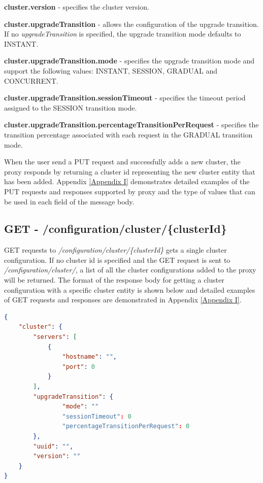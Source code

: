 \documentclass[a4paper,11pt,twoside]{report}
\begin{document}
\begin{list}{-}{}
  \item\textbf{{cluster.version}} - specifies the cluster version. 
  
  \item\textbf{{cluster.upgradeTransition}} - allows the configuration of the upgrade transition. If no \textit{upgradeTransition} is specified, the upgrade transition mode defaults to INSTANT.  
  
  \item\textbf{{cluster.upgradeTransition.mode}} - specifies the upgrade transition mode and support the following values: INSTANT, SESSION, GRADUAL and CONCURRENT.
   
  \item\textbf{{cluster.upgradeTransition.sessionTimeout}} - specifies the timeout period assigned to the SESSION transition mode.
  
  \item\textbf{{cluster.upgradeTransition.percentageTransitionPerRequest}} - specifies the transition percentage associated with each request in the GRADUAL transition mode.
\end{list}

\noindent
When the user send a PUT request and successfully adds a new cluster, the proxy responds by returning a cluster id representing the new cluster entity that has been added. Appendix \ref{Appendix  I} demonstrates detailed examples of the PUT requests and responses supported by proxy and the type of values that can be used in each field of the message body.

\subsection{GET - /configuration/cluster/\{clusterId\}} 
GET requests to \textit{/configuration/cluster/\{clusterId\}} gets a single cluster configuration. If no cluster id is specified and the GET request is sent to \textit{/configuration/cluster/}, a list of all the cluster configurations added to the proxy will be returned. The format of the response body for getting a cluster configuration with a specific cluster entity is shown below and detailed examples of GET requests and responses are demonstrated in Appendix \ref{Appendix  I}.\bigskip

\begin{lstlisting}[language=json]
{
    "cluster": {
        "servers": [
            {
                "hostname": "",
                "port": 0
            }
        ],
        "upgradeTransition": {
                "mode": ""
                "sessionTimeout": 0  
                "percentageTransitionPerRequest": 0  
        },
        "uuid": "",
        "version": ""
    }
}

\end{lstlisting}
\end{document}

